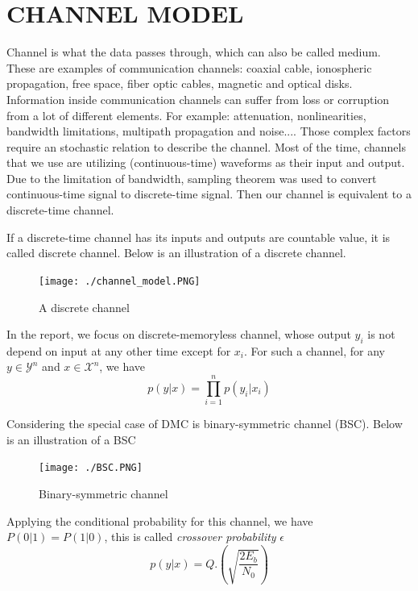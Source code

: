 \documentclass[a4paper, 13pt]{report}
\begin{document}
\chapter{CHANNEL MODEL}
\par Channel is what the data passes through, which can also be called medium. These are examples of communication channels: coaxial cable, ionospheric propagation, free space, fiber optic cables, magnetic and optical disks. Information inside communication channels can suffer from loss or corruption from a lot of different elements. For example: attenuation, nonlinearities, bandwidth limitations, multipath propagation and noise.... Those complex factors require an stochastic relation to describe the channel. Most of the time, channels that we use are utilizing (continuous-time) waveforms as their input and output. Due to the limitation of bandwidth, sampling theorem was used to convert continuous-time signal to discrete-time signal. Then our channel is equivalent to a discrete-time channel.
\par If a discrete-time channel has its inputs and outputs are countable value, it is called discrete channel. Below is an illustration of a discrete channel.
\begin{figure}[h]  %
    \centering
    \texttt{[image: ./channel\_model.PNG]}
    \caption{A discrete channel}
    \label{fig:discrete channel}
\end{figure}
\par In the report, we focus on discrete-memoryless channel, whose output $y_i$ is not depend on input at any other time except for $x_i$. For such a channel, for any $y\in\mathscr{Y}^{n}$ and $x\in\mathscr{X}^{n}$, we have  
\begin{equation}
    p(y|x) = \prod_{i=1}^{n} p(y_i|x_i)
\end{equation}
\par Considering the special case of DMC is binary-symmetric channel (BSC). Below is an illustration of a BSC
\begin{figure}[H]  %
    \centering
    \texttt{[image: ./BSC.PNG]}
    \caption{Binary-symmetric channel}
    \label{fig:bsc}
\end{figure}
\par Applying the conditional probability for this channel, we have $P(0|1)=P(1|0)$, this is called \textit{crossover probability} $\epsilon$
\begin{equation}
    p(y|x) = Q.(\sqrt{\frac{2E_b}{N_0}})
\end{equation}
\end{document}
